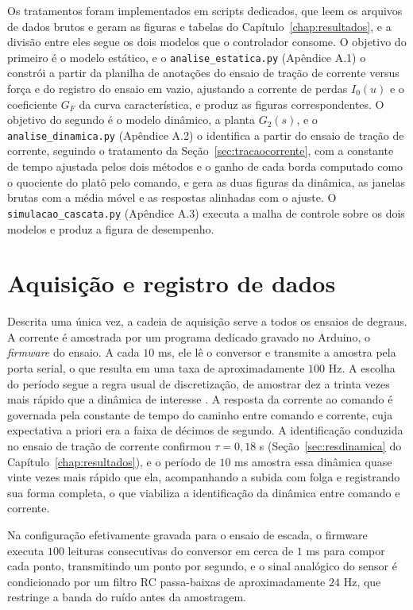 Os tratamentos foram implementados em scripts dedicados, que leem os arquivos de dados
brutos e geram as figuras e tabelas do Capítulo~\ref{chap:resultados}, e a divisão entre
eles segue os dois modelos que o controlador consome. O objetivo do primeiro é o modelo
estático, e o \texttt{analise\_estatica.py} (Apêndice A.1) o constrói a partir da planilha
de anotações do ensaio de tração de corrente versus força e do registro do ensaio em vazio,
ajustando a corrente de perdas $I_0(u)$ e o coeficiente $G_F$ da curva característica, e
produz as figuras correspondentes. O objetivo do segundo é o modelo dinâmico, a planta
$G_2(s)$, e o \texttt{analise\_dinamica.py} (Apêndice A.2) o identifica a partir do ensaio
de tração de corrente, seguindo o tratamento da Seção~\ref{sec:tracaocorrente}, com a
constante de tempo ajustada pelos dois métodos e o ganho de cada borda computado como o
quociente do platô pelo comando, e gera as duas figuras da dinâmica, as janelas brutas com
a média móvel e as respostas alinhadas com o ajuste. O \texttt{simulacao\_cascata.py}
(Apêndice A.3) executa a malha de controle sobre os dois modelos e produz a figura de
desempenho.

\section{Aquisição e registro de dados}
\label{sec:registro}

Descrita uma única vez, a cadeia de aquisição serve a todos os ensaios de degraus. A
corrente é amostrada por um programa dedicado gravado no Arduino, o \emph{firmware} do
ensaio. A cada $10$ ms, ele lê o conversor e transmite a amostra pela porta serial, o que
resulta em uma taxa de aproximadamente $100$ Hz. A escolha do período segue a regra usual
de discretização, de amostrar dez a trinta vezes mais rápido que a dinâmica de interesse
\cite{raffo_tcpi_sintese}. A resposta da corrente ao comando é governada pela constante
de tempo do caminho entre comando e corrente, cuja expectativa a priori era a faixa de décimos de
segundo. A identificação conduzida no ensaio de tração de corrente confirmou $\tau = 0{,}18$ s
(Seção~\ref{sec:resdinamica} do Capítulo~\ref{chap:resultados}), e o período de
$10$ ms amostra essa dinâmica quase vinte vezes mais rápido que ela, acompanhando a subida
com folga e registrando sua forma completa, o que viabiliza a identificação da dinâmica
entre comando e corrente.

Na configuração efetivamente gravada para o ensaio de escada, o firmware executa $100$
leituras consecutivas do conversor em cerca de $1$ ms para compor cada ponto, transmitindo
um ponto por segundo, e o sinal analógico do sensor é condicionado por um filtro RC
passa-baixas de aproximadamente $24$ Hz, que restringe a banda do ruído antes da amostragem.

